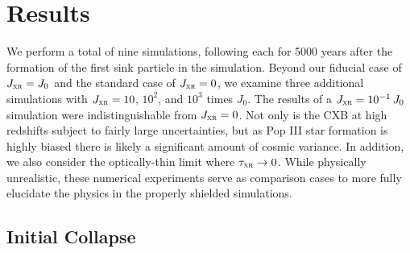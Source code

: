 \documentclass[../thesis.tex]{subfiles}
\begin{document}
\section{Results}
\label{xr_results}
We perform a total of nine simulations, following each for 5000 years after the formation of the first sink particle in the simulation.  Beyond our fiducial case of $J_{\textsc{xr}}=J_0$ and the standard case of $J_{\textsc{xr}}=0$, we examine three additional  simulations with $J_{\textsc{xr}} = 10$, $10^2$, and $10^3$ times $J_0$. The results of a $J_{\textsc{xr}} = 10^{-1}\,J_0$ simulation were indistinguishable from $J_{\textsc{xr}}=0$. Not only is the CXB at high redshifts subject to fairly large uncertainties, but as Pop III star formation is highly biased there is likely a significant amount of cosmic variance.
In addition, we also consider the optically-thin limit where $\tau_{\textsc{xr}} \rightarrow 0$.  While physically unrealistic, these numerical experiments serve as comparison cases to more fully elucidate the physics in the properly shielded simulations.

\subsection{Initial Collapse}
\label{collapse}
\end{document}
